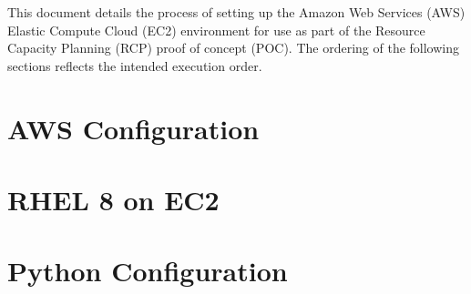 \documentclass[letterpaper]{article}
\newcommand\liststyleWWNumxxxiii{%
\renewcommand\labelitemi{$\bullet$}
\renewcommand\labelitemii{$\bullet$}
\renewcommand\labelitemiii{$\bullet$}
\renewcommand\labelitemiv{$\bullet$}
}
\begin{document}
This document details the process of setting up the Amazon Web Services (AWS) Elastic Compute Cloud (EC2) environment for use as part of the Resource Capacity Planning (RCP) proof of concept (POC).  The ordering of the following sections reflects the intended execution order.


\section{AWS Configuration}
\bigskip

\lipsum[1]




\section{RHEL 8 on EC2}
\bigskip

\lipsum[2]

% 
% 
% 
% 
% 
% 
% 
% 
% 
% 
% 
% 
% 
% 


\section{Python Configuration}
\bigskip

\lipsum[3]


% 
% 
% 
% 
% 
% 
% 
% 
% 
% 
% 
% 
% 
% 
% 
% 
\end{document}
